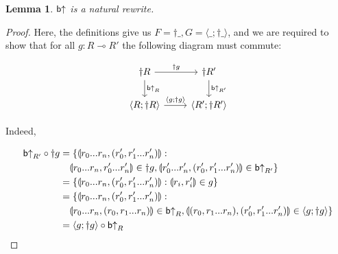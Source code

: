 \documentclass[11pt, oneside]{article}
\theoremstyle{plain}
\newtheorem{lemma}[theorem]{Lemma}
\theoremstyle{definition}
\let\originaldagger\dagger
\renewcommand{\dag}{\mathord{\originaldagger}}
\newcommand{\la}{\langle}
\newcommand{\ra}{\rangle}
\newcommand{\lp}{\llparenthesis}
\newcommand{\rp}{\rrparenthesis}
\newcommand{\comp}{\mathbin{\circ}}
\begin{document}
\begin{lemma}
${\mathsf b}{ \uparrow}$ is a natural rewrite.
\end{lemma}

\begin{proof}
Here, the definitions give us $F = \dag\_, G = \la\_;\dag\_\ra$, and we are required to show that for all $g:R\multimap R'$ the following diagram must commute:

\[
\begin{tikzcd}
    \dag R \arrow[r,"\dag g"]\arrow[d,"\bU_{R}"]& \dag R' \arrow[d,"\bU_{R'}"] \\
    \la R; \dag R\ra \arrow[r,"\la g;\dag g\ra"] & \la R';\dag R'\ra
\end{tikzcd}
\]

Indeed,

\begin{align*}
\bU_{R'}\comp\dag g &= \{\lp r_0...r_n,(r'_0,r'_1...r'_n)\rp: \\
&\quad\lp r_0...r_n,r'_0...r'_n\rp\in\dag g,\lp r'_0...r'_n,(r'_0,r'_1...r'_n)\rp\in\bU_{R'}\} \\
&= \{\lp r_0...r_n,(r'_0,r'_1...r'_n)\rp:\lp r_i,r'_i\rp\in g\} \\
&= \{\lp r_0...r_n,(r'_0,r'_1...r'_n)\rp: \\
&\quad\lp r_0...r_n,(r_0,r_1...r_n)\rp\in\bU_{R},\lp(r_0,r_1...r_n),(r'_0,r'_1...r'_n)\rp\in\la g;\dag g\ra\} \\
&= \la g;\dag g\ra\comp\bU_{R}
\end{align*}
\end{proof}
\end{document}
